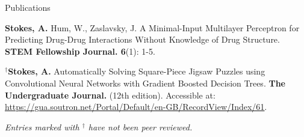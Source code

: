 \begin{rSection}{Publications}
\begin{enumerate}[label={[\arabic*]}]
  \item {\bf Stokes, A.} Hum, W., Zaslavsky, J. A Minimal-Input Multilayer Perceptron for Predicting Drug-Drug Interactions Without Knowledge of Drug Structure. \textbf{STEM Fellowship Journal. 6}(1): 1-5.
  \item $^\dagger${\bf Stokes, A.} Automatically Solving Square-Piece Jigsaw Puzzles using Convolutional Neural Networks with Gradient Boosted Decision Trees. \textbf{The Undergraduate Journal.} (12th edition). Accessible at: \underline{\href{https://gua.soutron.net/Portal/Default/en-GB/RecordView/Index/61}{https://gua.soutron.net/Portal/Default/en-GB/RecordView/Index/61}}.
\end{enumerate}

\smallskip
{\em Entries marked with $^\dagger$ have not been peer reviewed.}

\end{rSection}